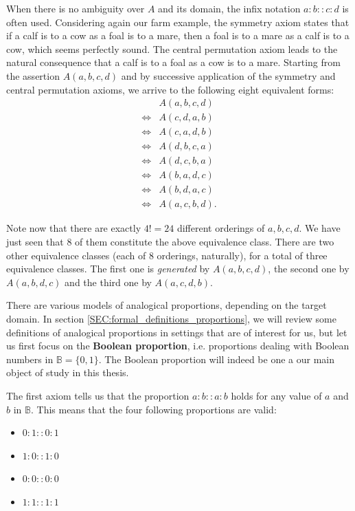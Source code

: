 When there is no ambiguity over $A$ and its domain, the infix notation
$a:b::c:d$ is often used. Considering again our farm example, the symmetry
axiom states that if a calf is to a cow as a foal is to a mare, then a foal is
to a mare as a calf is to a cow, which seems perfectly sound. The central
permutation axiom leads to the natural consequence that a calf is to a foal as
a cow is to a mare.
Starting from the assertion $A(a, b, c, d)$ and by successive application of
the symmetry and central permutation axioms, we arrive to the following eight
equivalent forms:
\begin{align*}
       &A(a, b, c, d)\\
  \iff &A(c, d, a, b)\\
  \iff &A(c, a, d, b)\\
  \iff &A(d, b, c, a)\\
  \iff &A(d, c, b, a)\\
  \iff &A(b, a, d, c)\\
  \iff &A(b, d, a, c)\\
  \iff &A(a, c, b, d).
\end{align*}

Note now that there are exactly $4! = 24$ different orderings of $a, b, c, d$.
We have just seen that $8$ of them constitute the above equivalence class.
There are two other equivalence classes (each of $8$ orderings, naturally), for
a total of three equivalence classes. The first one is \textit{generated} by
$A(a, b, c, d)$, the second one by $A(a, b, d, c)$ and the third one by $A(a,
c, d, b)$.

There are various models of analogical proportions, depending on the target
domain. In section \ref{SEC:formal_definitions_proportions}, we will review
some definitions of analogical proportions in settings that are of interest for
us, but let us first focus on the \textbf{Boolean proportion}, i.e. proportions
dealing with Boolean numbers in $\mathbb{B} = \{0, 1\}$. The Boolean proportion
will indeed be one a our main object of study in this thesis.

The first axiom tells us that the proportion $a:b::a:b$ holds for any value of
$a$ and $b$ in $\mathbb{B}$. This means that the four following proportions are
valid:
\begin{itemize}
  \item $0 : 1 :: 0 :1$
  \item $1 : 0 :: 1 :0$
  \item $0 : 0 :: 0 :0$
  \item $1 : 1 :: 1 :1$
\end{itemize}

